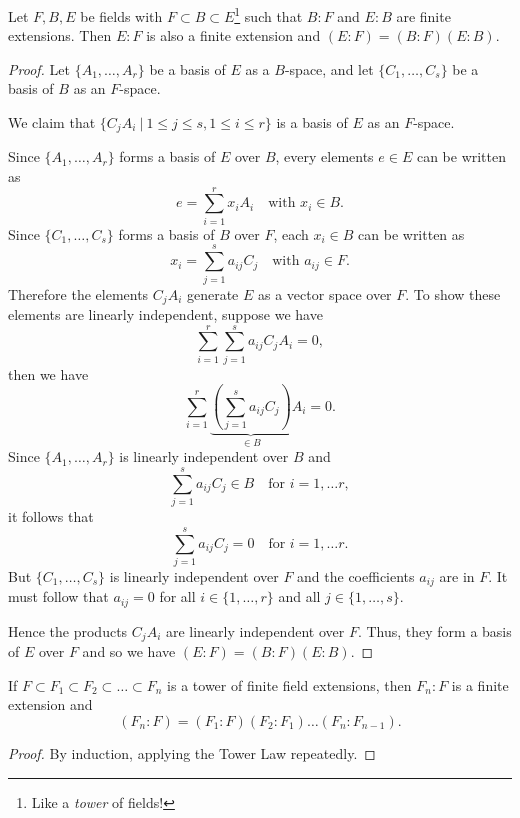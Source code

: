 \begin{theorem}
	Let $F, B, E$ be fields with $F \subset B \subset E$\footnote{Like a \emph{tower} of fields!} such that $B:F$ and $E:B$ are finite extensions. Then $E:F$ is also a finite extension and $(E:F) = (B:F)(E:B)$.
	\begin{proof}
		Let $\{A_1, \dots, A_r\}$ be a basis of $E$ as a $B$-space, and let $\{C_1, \dots, C_s\}$ be a basis of $B$ as an $F$-space.
		
		We claim that $\{C_j A_i\ |\ 1 \leq j \leq s, 1 \leq i \leq r\}$ is a basis of $E$ as an $F$-space.
		
		Since $\{A_1, \dots, A_r\}$ forms a basis of $E$ over $B$, every elements $e \in E$ can be written as
		\[
			e = \sum_{i = 1}^r{x_i A_i} \quad \text{with } x_i \in B.
		\]
		Since $\{C_1, \dots, C_s\}$ forms a basis of $B$ over $F$, each $x_i \in B$ can be written as
		\[
			x_i = \sum_{j = 1}^s{a_{ij} C_j} \quad \text{with } a_{ij} \in F.
		\]
		Therefore the elements $C_j A_i$ generate $E$ as a vector space over $F$. To show these elements are linearly independent, suppose we have
		\[
			\sum_{i = 1}^r{\sum_{j = 1}^s{a_{ij} C_j A_i}} = 0,
		\]
		then we have
		\[
			\sum_{i = 1}^r{\underbrace{\left(\sum_{j = 1}^s{a_{ij} C_j}\right)}_{\in B} A_i} = 0.
		\]
		Since $\{A_1, \dots, A_r\}$ is linearly independent over $B$ and
		\[
			\sum_{j = 1}^s{a_{ij} C_j} \in B \quad \text{for } i = 1, \dots r,
		\]
		it follows that
		\[
			\sum_{j = 1}^s{a_{ij} C_j} = 0 \quad \text{for } i = 1, \dots r.
		\]
		But $\{C_1, \dots, C_s\}$ is linearly independent over $F$ and the coefficients $a_{ij}$ are in $F$. It must follow that $a_{ij} = 0$ for all $i \in \{1, \dots, r\}$ and all $j \in \{1, \dots, s\}$.
		
		Hence the products $C_j A_i$ are linearly independent over $F$. Thus, they form a basis of $E$ over $F$ and so we have $(E : F) = (B : F)(E : B)$.
	\end{proof}
\end{theorem}

\begin{corollary}
	If $F \subset F_1 \subset F_2 \subset \dots \subset F_n$ is a tower of finite field extensions, then $F_n : F$ is a finite extension and
	\[
		(F_n : F) = (F_1 : F)(F_2 : F_1)\dots(F_n : F_{n - 1}).
	\]
	\begin{proof}
		By induction, applying the Tower Law repeatedly.
	\end{proof}
\end{corollary}

